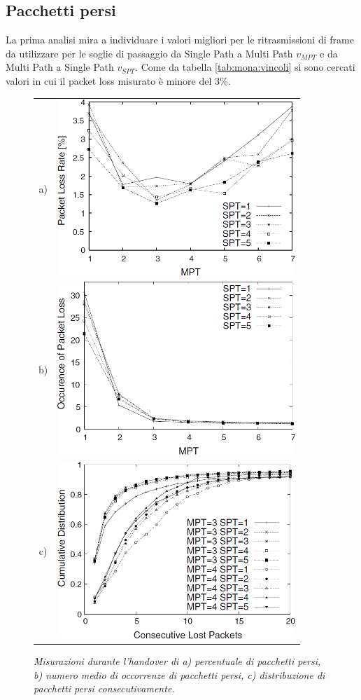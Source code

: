 \documentclass[12pt,a4paper,openright,twoside]{book}
\begin{document}
\subsection{Pacchetti persi}
\label{sec:mona:sim-packet-loss}

La prima analisi mira a individuare i valori migliori per le
ritrasmissioni di frame da utilizzare per le soglie di passaggio da
Single Path a Multi Path $v_{MPT}$ e da Multi Path a Single Path
$v_{SPT}$. Come da tabella \ref{tab:mona:vincoli} si sono cercati
valori in cui il packet loss misurato è minore del 3\%.

\begin{figure}
  \centering
  \begin{tabular}{cc}
    a) & \includegraphics[width=9cm]{img/mona-sim-packet-loss-rate}  \\
    b) & \includegraphics[width=9cm]{img/mona-sim-packet-loss-occur} \\
    c) & \includegraphics[width=9cm]{img/mona-sim-packet-loss-distrib}  \\
  \end{tabular}
  \caption{\em Misurazioni durante l'handover di a) percentuale di
    pacchetti persi, b) numero medio di occorrenze di pacchetti persi,
    c) distribuzione di pacchetti persi consecutivamente.}
  \label{fig:mona:qos-sim-packet-loss}
\end{figure}
\end{document}
